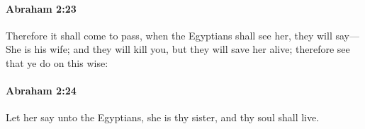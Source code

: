 
		\paragraph{Abraham 2:23} %
			\label{ABRAHAM-2-23}

			Therefore it shall come to pass, when the Egyptians shall see her, they will say—She is his wife; and they will kill you, but they will save her alive; therefore see that ye do on this wise:


		\paragraph{Abraham 2:24} %
			\label{ABRAHAM-2-24}

			Let her say unto the Egyptians, she is thy sister, and thy soul shall live.	


